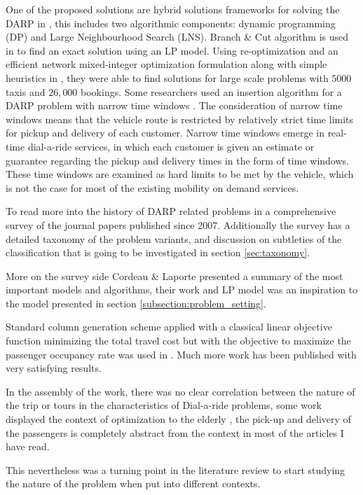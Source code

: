 \documentclass{article}
\begin{document}
One of the proposed solutions are hybrid solutions frameworks for solving the DARP in \cite{Ritzinger_Puchinger2016}, this  includes two algorithmic components: dynamic programming (DP) and Large Neighbourhood Search (LNS). Branch \& Cut algorithm is used in \cite{Cordeau2006} to find an exact solution using an LP model. Using re-optimization and an efficient network mixed-integer optimization formulation along with simple heuristics in \cite{Bertsimas2018}, they were able to find solutions for large scale problems with $5000$ taxis and $26,000$ bookings. Some researchers used an insertion algorithm for a DARP problem with narrow time windows \cite{HAME2011}. The consideration of narrow time windows means that the vehicle route is restricted by relatively strict time limits for pickup and delivery of each customer. Narrow time windows emerge in real-time dial-a-ride services, in which each customer is given an estimate or guarantee regarding the pickup and delivery times in the form of time windows. 
These time windows are examined as hard limits to be met by the vehicle, which is not the case for most of the existing mobility on demand services.

To read more into the history of DARP related problems in \cite{HO_darp2018} a comprehensive survey of the journal papers published since 2007. Additionally the survey has a detailed taxonomy of the problem variants, and discussion on subtleties of the classification that is going to be investigated in section \ref{sec:taxonomy}. 

More on the survey side Cordeau \& Laporte presented a summary of the most important models and algorithms\cite{2008_Cordeau_Laporte}, their work and LP model was an inspiration to the model presented in section \ref{subsection:problem_setting}.  

Standard column generation scheme applied with a classical linear objective function minimizing the total travel cost but with the objective to maximize the passenger occupancy rate was used in \cite{Garaix2010}. Much more work has been published with very satisfying results. 

In the assembly of the work, there was no clear correlation  between the nature of the trip or tours in the characteristics of Dial-a-ride problems, some work displayed the context of optimization to the elderly \citep{STIGLIC201812}, the pick-up and delivery of the passengers is completely abstract from the context in most of the articles I have read.

This nevertheless was a turning point in the literature review to start studying the nature of the problem when put into different contexts. \\
\end{document}
